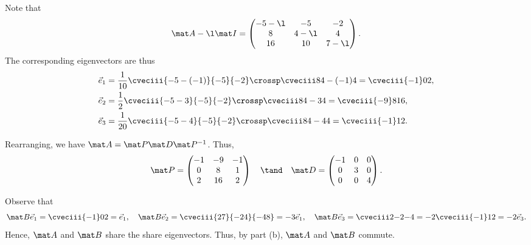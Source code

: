 \begin{solution}
\begin{ppart}
        Note that \[\mat A - \l \mat I = \begin{pmatrix}-5 -\l & -5 & -2 \\ 8 & 4-\l & 4 \\ 16 & 10 & 7-\l\end{pmatrix}.\] The corresponding eigenvectors are thus
        \begin{align*}
            \vec e_1 &= \frac1{10} \cveciii{-5-(-1)}{-5}{-2} \crossp \cveciii8{4-(-1)}4 = \cveciii{-1}02,\\
            \vec e_2 &= \frac{1}{2} \cveciii{-5-3}{-5}{-2} \crossp \cveciii8{4-3}4 = \cveciii{-9}8{16},\\
            \vec e_3 &= \frac1{20} \cveciii{-5-4}{-5}{-2} \crossp \cveciii8{4-4}{4} = \cveciii{-1}12.
        \end{align*}
    \end{ppart}
    \begin{ppart}
        Rearranging, we have $\mat A = \mat P \mat D \mat P^{-1}$. Thus, \[\mat P = \begin{pmatrix}-1 & -9 & -1 \\ 0 & 8 & 1 \\ 2 & 16 & 2\end{pmatrix} \quad \tand \quad \mat D = \begin{pmatrix}-1 & 0 & 0 \\ 0 & 3 & 0 \\ 0 & 0 & 4\end{pmatrix}.\]
    \end{ppart}
    \begin{ppart}
        Observe that \[\mat B \vec e_1 = \cveciii{-1}02 = \vec e_1, \quad \mat B \vec e_2 = \cveciii{27}{-24}{-48} = -3\vec e_1, \quad \mat B \vec e_3 = \cveciii2{-2}{-4} = -2\cveciii{-1}12 = -2\vec e_3.\] Hence, $\mat A$ and $\mat B$ share the share eigenvectors. Thus, by part (b), $\mat A$ and $\mat B$ commute.
    \end{ppart}
\end{solution}

